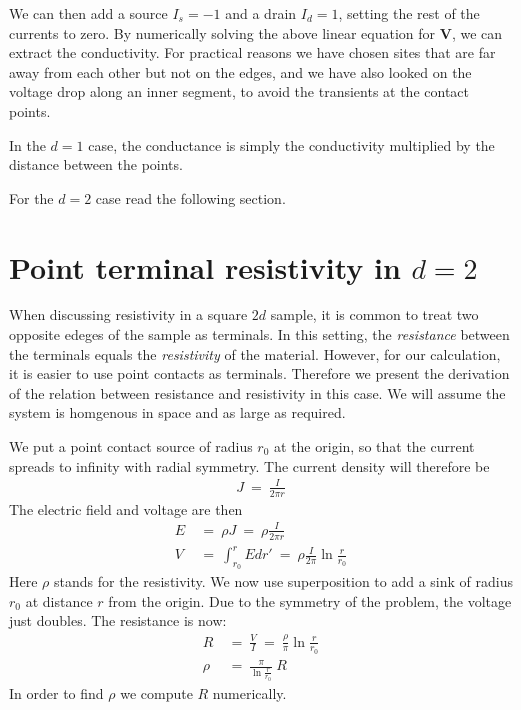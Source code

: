 We can then add a source $I_s=-1$ and a drain $I_d=1$, setting the rest
of the currents to zero. By numerically solving the above linear equation for $\bm{V}$,
we can extract the conductivity. For practical reasons we have chosen
sites that are far away from each other but not on the edges,
and we have also looked on the voltage drop along an inner segment, to
avoid the transients at the contact points. 


In the $d{=}1$ case, the conductance is simply the conductivity multiplied
by the distance between the points.


For the $d{=}2$ case read the following section.

\section{Point terminal resistivity in $d{=}2$}

When discussing resistivity in a square $2d$ sample, it is common
to treat two opposite edeges of the sample as terminals.
In this setting, the \emph{resistance} between the terminals equals the
\emph{resistivity} of the material. However, for our calculation,
it is easier to use point contacts as terminals. Therefore we present the
derivation of the relation between resistance and resistivity in this case.
We will assume the system is homgenous in space and as large as required.


We put a point contact source of radius $r_0$ at the origin, so 
that the current spreads to infinity with radial symmetry. The current 
density will therefore be
%
\begin{align}
J\ =\ \frac{I}{2\pi r}
\end{align}
%
The electric field and voltage are then
%
\begin{align}
E \ &=\ \rho J\ =\ \rho \frac{I}{2\pi r } \\
V \ &=\ \int_{r_0}^r E dr' \ =\ \rho\frac{I}{2\pi}\ln \frac{r}{r_0}
\end{align}
%
Here $\rho$ stands for the resistivity. We now use superposition to add a sink of radius $r_0$ at distance $r$ 
from the origin. Due to the symmetry of the problem, the voltage just doubles. The resistance is now:
%
\begin{align}
R \ &=\ \frac{V}{I}\ =\ \frac{\rho}{\pi} \ln\frac{r}{r_0} \\
\rho \ &= \ \frac{\pi}{\ln\frac{r}{r_0}} \ R
\end{align}
%
In order to find $\rho$ we compute $R$ numerically.


